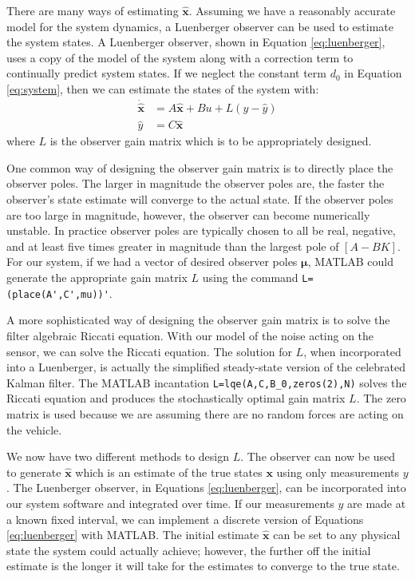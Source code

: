 \documentclass{article}
\begin{document}
There are many ways of estimating $\pmb{\hat{x}}$.  Assuming we have a reasonably accurate model for the system dynamics, a Luenberger observer can be used to estimate the system states.  A Luenberger observer, shown in Equation \ref{eq:luenberger}, uses a copy of the model of the system along with a correction term to continually predict system states.  If we neglect the constant term $d_0$ in Equation \ref{eq:system}, then we can estimate the states of the system with:
\begin{equation}
\begin{split}
\label{eq:luenberger}
\pmb{\dot{\hat{x}}}&=A\pmb{\hat{x}}+Bu+L(y-\hat{y}) \\
\hat{y}&=C\pmb{\hat{x}}
\end{split}
\end{equation}
where $L$ is the observer gain matrix which is to be appropriately designed.  

One common way of designing the observer gain matrix is to directly place the observer poles. The larger in magnitude the observer poles are, the faster the observer's state estimate will converge to the actual state.  If the observer poles are too large in magnitude, however, the observer can become numerically unstable.  In practice observer poles are typically chosen to all be real, negative, and at least five times greater in magnitude than the largest pole of $[A-BK]$.  For our system, if we had a vector of desired observer poles $\pmb{\mu}$, MATLAB could generate the appropriate gain matrix $L$ using the command \verb+L=(place(A',C',mu))'+.

A more sophisticated way of designing the observer gain matrix is to solve the filter algebraic Riccati equation.  With our model of the noise acting on the sensor, we can solve the Riccati equation.  The solution for $L$, when incorporated into a Luenberger, is actually the simplified steady-state version of the celebrated Kalman filter.  The MATLAB incantation \verb+L=lqe(A,C,B_0,zeros(2),N)+ solves the Riccati equation and produces the stochastically optimal gain matrix $L$.  The zero matrix is used because we are assuming there are no random forces are acting on the vehicle.

%
%
%
%
%
%
%


We now have two different methods to design $L$.  The observer can now be used to generate $\pmb{\hat{x}}$ which is an estimate of the true states $\pmb{x}$ using only measurements $y$.  The Luenberger observer, in Equations \ref{eq:luenberger}, can be incorporated into our system software and integrated over time.  If our measurements $y$ are made at a known fixed interval, we can implement a discrete version of Equations \ref{eq:luenberger} with MATLAB.  The initial estimate $\pmb{\hat{x}}$ can be set to any physical state the system could actually achieve; however, the further off the initial estimate is the longer it will take for the estimates to converge to the true state.   
\end{document}
